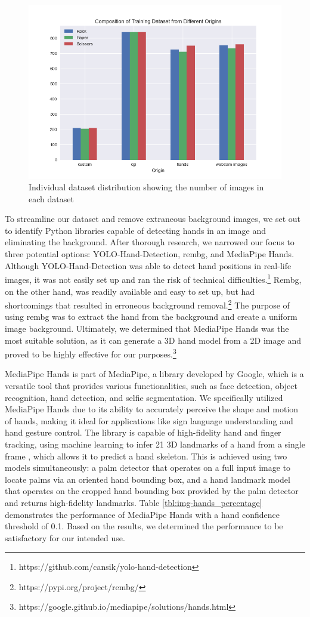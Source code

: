 \documentclass[a4paper]{article}
\begin{document}
\begin{figure}
       \centering
      \includegraphics[width=.75\textwidth]{img/ds_analysis/train_ds.png}
       \caption{Individual dataset distribution showing the number of images in each dataset}
       \label{fig:all_data}
   \end{figure} 


To streamline our dataset and remove extraneous background images, we set out to identify Python libraries capable of detecting hands in an image and eliminating the background. After thorough research, we narrowed our focus to three potential options: YOLO-Hand-Detection, rembg, and MediaPipe Hands. Although YOLO-Hand-Detection was able to detect hand positions in real-life images, it was not easily set up and ran the risk of technical difficulties.\footnote{https://github.com/cansik/yolo-hand-detection} Rembg, on the other hand, was readily available and easy to set up, but had shortcomings that resulted in erroneous background removal.\footnote{https://pypi.org/project/rembg/} The purpose of using rembg was to extract the hand from the background and create a uniform image background. Ultimately, we determined that MediaPipe Hands was the most suitable solution, as it can generate a 3D hand model from a 2D image and proved to be highly effective for our purposes.\footnote{https://google.github.io/mediapipe/solutions/hands.html}

MediaPipe Hands is part of MediaPipe, a library developed by Google, which is a versatile tool that provides various functionalities, such as face detection, object recognition, hand detection, and selfie segmentation. We specifically utilized MediaPipe Hands due to its ability to accurately perceive the shape and motion of hands, making it ideal for applications like sign language understanding and hand gesture control. The library is capable of high-fidelity hand and finger tracking, using machine learning to infer 21 3D landmarks of a hand from a single frame \cite{mediapipe}, which allows it to predict a hand skeleton. This is achieved using two models simultaneously: a palm detector that operates on a full input image to locate palms via an oriented hand bounding box, and a hand landmark model that operates on the cropped hand bounding box provided by the palm detector and returns high-fidelity landmarks. Table \ref{tbl:img-hands_percentage} demonstrates the performance of MediaPipe Hands with a hand confidence threshold of 0.1. Based on the results, we determined the performance to be satisfactory for our intended use.
\end{document}
